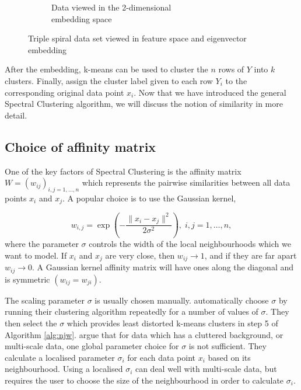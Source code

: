 \begin{figure}[h!]
\begin{subfigure}{0.4\textwidth}
     \caption{Data viewed in the 2-dimensional \\ embedding space }
     \label{fig:spirals_embedded}
     \end{subfigure}
  \caption{Triple spiral data set viewed in feature space and eigenvector embedding}
  \label{fig:triple_spirals}
\end{figure}


After the embedding, k-means can be used to cluster the $n$ rows of $Y$ into $k$ clusters. Finally, assign the cluster label given to each row $Y_i$ to the corresponding original data point $x_i$. Now that we have introduced the general Spectral Clustering algorithm, we will discuss the notion of similarity in more detail.

\subsection{Choice of affinity matrix}
\label{sec:affinity}

One of the key factors of Spectral Clustering is the affinity matrix $W = (w_{ij})_{ i,j = 1, \ldots, n}$  which represents the pairwise similarities between all data points $x_i$ and $x_j$. A popular choice is to use the Gaussian kernel, 

\begin{equation}
  \label{eq:gaussian_affinity}
    w_{i,j} = \exp  \left( - \frac{\| x_i - x_j \|^2}{2 \sigma^2} \right), \; i, j = 1, \ldots, n,
\end{equation}
where the parameter $\sigma$ controls the width of the local neighbourhoods which we want to model. If $x_i$ and $x_j$ are very close, then $w_{ij} \rightarrow 1 $, and if they are far apart $w_{ij} \rightarrow 0$. A Gaussian kernel affinity matrix will have ones along the diagonal and is symmetric $(w_{ij} = w_{ji})$.

The scaling parameter $\sigma$ is usually chosen manually. \cite{Ng2001} automatically choose $\sigma$ by running their clustering algorithm repeatedly for a number of values of $\sigma$. They then select the $\sigma$ which provides least distorted k-means clusters in step 5 of Algorithm \ref{alg:njw}. \cite{Zelnik-Manor2004} argue that for data which has a cluttered background, or multi-scale data, one global parameter choice for $\sigma$ is not sufficient. They calculate a localised parameter $\sigma_i$ for each data point $x_i$ based on its neighbourhood. Using a localised $\sigma_i$ can deal well with multi-scale data, but requires the user to choose the size of the neighbourhood in order to calculate $\sigma_i$. 

